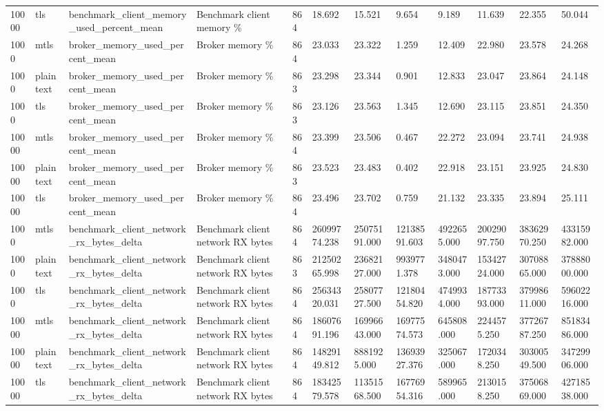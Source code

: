 \begin{longtable}{llllllllllll}
10000 & tls & benchmark\_client\_memory\_used\_percent\_mean & Benchmark client memory \% & 864 & 18.692 & 15.521 & 9.654 & 9.189 & 11.639 & 22.355 & 50.044 \\
1000 & mtls & broker\_memory\_used\_percent\_mean & Broker memory \% & 864 & 23.033 & 23.322 & 1.259 & 12.409 & 22.980 & 23.578 & 24.268 \\
1000 & plaintext & broker\_memory\_used\_percent\_mean & Broker memory \% & 863 & 23.298 & 23.344 & 0.901 & 12.833 & 23.047 & 23.864 & 24.148 \\
1000 & tls & broker\_memory\_used\_percent\_mean & Broker memory \% & 863 & 23.126 & 23.563 & 1.345 & 12.690 & 23.115 & 23.851 & 24.350 \\
10000 & mtls & broker\_memory\_used\_percent\_mean & Broker memory \% & 864 & 23.399 & 23.506 & 0.467 & 22.272 & 23.094 & 23.741 & 24.938 \\
10000 & plaintext & broker\_memory\_used\_percent\_mean & Broker memory \% & 863 & 23.523 & 23.483 & 0.402 & 22.918 & 23.151 & 23.925 & 24.830 \\
10000 & tls & broker\_memory\_used\_percent\_mean & Broker memory \% & 864 & 23.496 & 23.702 & 0.759 & 21.132 & 23.335 & 23.894 & 25.111 \\
1000 & mtls & benchmark\_client\_network\_rx\_bytes\_delta & Benchmark client network RX bytes & 864 & 26099774.238 & 25075191.000 & 12138591.603 & 4922655.000 & 20029097.750 & 38362970.250 & 43315982.000 \\
1000 & plaintext & benchmark\_client\_network\_rx\_bytes\_delta & Benchmark client network RX bytes & 863 & 21250265.998 & 23682127.000 & 9939771.378 & 3480473.000 & 15342724.000 & 30708865.000 & 37888000.000 \\
1000 & tls & benchmark\_client\_network\_rx\_bytes\_delta & Benchmark client network RX bytes & 864 & 25634320.031 & 25807727.500 & 12180454.820 & 4749934.000 & 18773393.000 & 37998611.000 & 59602216.000 \\
10000 & mtls & benchmark\_client\_network\_rx\_bytes\_delta & Benchmark client network RX bytes & 864 & 18607691.196 & 16996643.000 & 16977574.573 & 645808.000 & 2244575.250 & 37726787.250 & 85183486.000 \\
10000 & plaintext & benchmark\_client\_network\_rx\_bytes\_delta & Benchmark client network RX bytes & 864 & 14829149.812 & 8881925.000 & 13693927.376 & 325067.000 & 1720348.250 & 30300549.500 & 34729906.000 \\
10000 & tls & benchmark\_client\_network\_rx\_bytes\_delta & Benchmark client network RX bytes & 864 & 18342579.578 & 11351568.500 & 16776954.316 & 589965.000 & 2130158.250 & 37506869.000 & 42718538.000 \\

\end{longtable}

